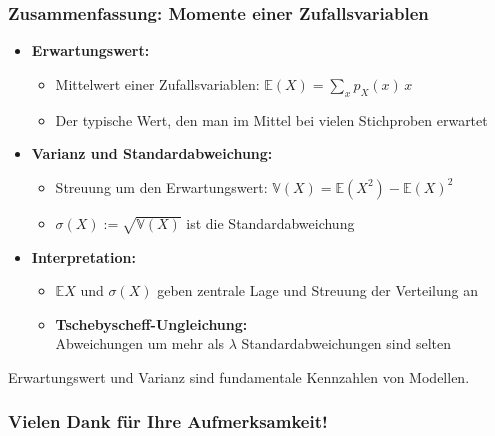\begin{frame}
  \frametitle{Zusammenfassung: Momente einer Zufallsvariablen}
  \begin{itemize}
    \item \textbf{Erwartungswert:}
      \begin{itemize}
        \item Mittelwert einer Zufallsvariablen: \(\mathbb{E}(X) = \sum_x p_X(x)\,x\)
        \item Der typische Wert, den man im Mittel bei vielen Stichproben erwartet
      \end{itemize}
    \item \textbf{Varianz und Standardabweichung:}
      \begin{itemize}
        \item Streuung um den Erwartungswert: \(\mathbb{V}(X) = \mathbb{E}(X^2) - \mathbb{E}(X)^2\)
        \item \(\sigma(X) := \sqrt{\mathbb{V}(X)}\) ist die Standardabweichung
      \end{itemize}
    \item \textbf{Interpretation:}
      \begin{itemize}
        \item $\mathbb{E}X$ und $\sigma(X)$ geben zentrale Lage und Streuung der Verteilung an
        \item \textbf{Tschebyscheff-Ungleichung:}\\
          Abweichungen um mehr als \(\lambda\) Standardabweichungen sind selten
      \end{itemize}
  \end{itemize}
  \vspace{0.5em}
  Erwartungswert und Varianz sind fundamentale Kennzahlen von Modellen.
\end{frame}


\begin{frame}[separator]
  \frametitle{Vielen Dank für Ihre Aufmerksamkeit!}
\end{frame}



